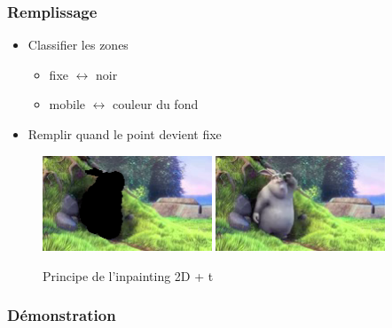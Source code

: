\begin{frame}
  \frametitle{Remplissage}
  
  \begin{itemize}
  \item Classifier les zones
  	\begin{itemize}
  	\item fixe $\leftrightarrow$ noir
  	\item mobile $\leftrightarrow$ couleur du fond
  	\end{itemize}
  \item Remplir quand le point devient fixe  
  \end{itemize}

  \begin{figure}
  \includegraphics[width=0.45\textwidth]{Fig/bunny2-masked.png}
  \includegraphics[width=0.45\textwidth]{Fig/bunny1-original.png}
  \caption{Principe de l'inpainting 2D + t}
  \end{figure}
   
\end{frame}


 \begin{frame}
   \frametitle{Démonstration}


 \end{frame}